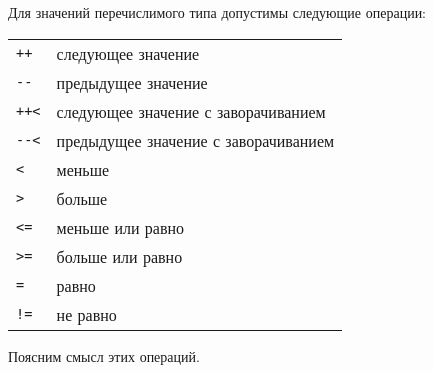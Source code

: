 \documentclass[10pt]{report}
\begin{document}
Для значений перечислимого типа допустимы следующие операции:
\begin{longtable}{ll}
	\texttt{+{}+}           & следующее значение                                \\
	\texttt{-{}-}           & предыдущее значение                               \\
	\texttt{+{}+<}          & следующее значение с заворачиванием               \\
	\texttt{-{}-<}          & предыдущее значение с заворачиванием              \\
	\texttt{<}              & меньше                                            \\
	\texttt{>}              & больше                                            \\
	\texttt{<=}             & меньше или равно                                  \\
	\texttt{>=}             & больше или равно                                  \\
	\texttt{=}              & равно                                             \\
	\texttt{!=}             & не равно                                          \\
\end{longtable}

Поясним смысл этих операций.
\end{document}
